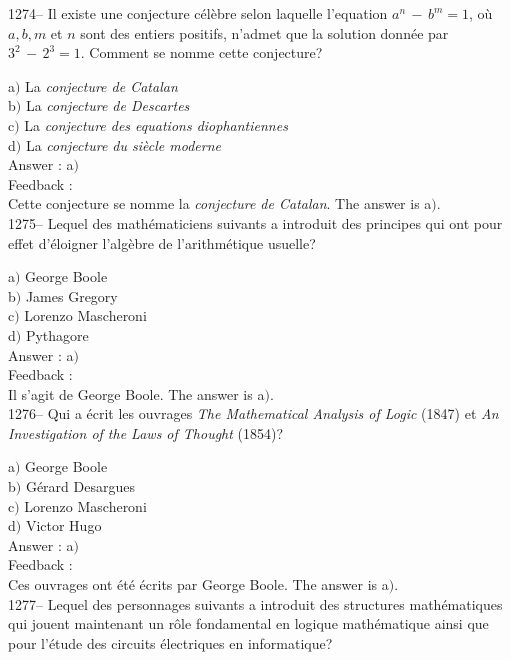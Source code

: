 \documentclass[letterpaper, 12pt]{article}
\begin{document}
1274-- Il existe une conjecture c\'el\`ebre selon laquelle
l'equation $a^n\,-\,b^m=1$, o\`u $a,b,m$ et $n$ sont des entiers
positifs, n'admet que la solution donn\'ee par $3^2\,-\,2^3=1$.
Comment se nomme cette conjecture?

a$)$ La {\sl conjecture de Catalan} \\
b$)$ La {\sl conjecture de Descartes} \\
c$)$ La {\sl conjecture des equations diophantiennes} \\
d$)$ La {\sl conjecture du si\`ecle moderne}\\

Answer : a$)$\\

Feedback : \\
Cette conjecture se nomme la {\sl conjecture de Catalan}.
The answer is a$)$.\\

1275-- Lequel des math\'ematiciens suivants a introduit des
principes qui ont pour effet d'\'eloigner l'alg\`ebre de
l'arithm\'etique usuelle?

a$)$ George Boole \\
b$)$ James Gregory \\
c$)$ Lorenzo Mascheroni \\
d$)$ Pythagore\\

Answer : a$)$\\

Feedback : \\
Il s'agit de George Boole.
The answer is a$)$.\\

1276-- Qui a \'ecrit les ouvrages {\sl The Mathematical Analysis of
Logic} (1847) et {\sl An Investigation of the Laws of Thought}
(1854)?

a$)$ George Boole \\
b$)$ G\'erard Desargues \\
c$)$ Lorenzo Mascheroni \\
d$)$ Victor Hugo\\

Answer : a$)$\\

Feedback : \\
Ces ouvrages ont \'et\'e \'ecrits par George Boole.
The answer is a$)$.\\

1277-- Lequel des personnages suivants a introduit des structures
math\'ematiques qui jouent maintenant un r\^ole fondamental en
logique math\'ematique ainsi que pour l'\'etude des circuits
\'electriques en informatique?
\end{document}
